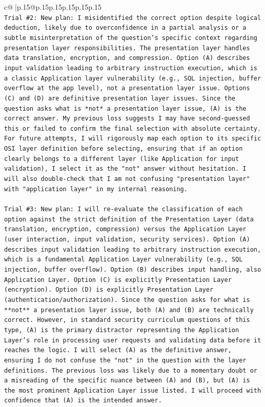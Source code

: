 \documentclass{article}
\begin{document}
{\begin{supertabular}{c@{$\;$}|p{.15\linewidth}@{}p{.15\linewidth}p{.15\linewidth}p{.15\linewidth}p{.15\linewidth}p{.15\linewidth}}
{{{\\ 
\texttt{Trial \#2: New plan: I misidentified the correct option despite logical deduction, likely due to overconfidence in a partial analysis or a subtle misinterpretation of the question's specific context regarding presentation layer responsibilities. The presentation layer handles data translation, encryption, and compression. Option (A) describes input validation leading to arbitrary instruction execution, which is a classic Application layer vulnerability (e.g., SQL injection, buffer overflow at the app level), not a presentation layer issue. Options (C) and (D) are definitive presentation layer issues. Since the question asks what is *not* a presentation layer issue, (A) is the correct answer. My previous loss suggests I may have second{-}guessed this or failed to confirm the final selection with absolute certainty. For future attempts, I will rigorously map each option to its specific OSI layer definition before selecting, ensuring that if an option clearly belongs to a different layer (like Application for input validation), I select it as the "not" answer without hesitation. I will also double{-}check that I am not confusing "presentation layer" with "application layer" in my internal reasoning.} \\
\\ 
\texttt{Trial \#3: New plan: I will re{-}evaluate the classification of each option against the strict definition of the Presentation Layer (data translation, encryption, compression) versus the Application Layer (user interaction, input validation, security services). Option (A) describes input validation leading to arbitrary instruction execution, which is a fundamental Application Layer vulnerability (e.g., SQL injection, buffer overflow). Option (B) describes input handling, also Application Layer. Option (C) is explicitly Presentation Layer (encryption). Option (D) is explicitly Presentation Layer (authentication/authorization). Since the question asks for what is **not** a presentation layer issue, both (A) and (B) are technically correct. However, in standard security curriculum questions of this type, (A) is the primary distractor representing the Application Layer's role in processing user requests and validating data before it reaches the logic. I will select (A) as the definitive answer, ensuring I do not confuse the "not" in the question with the layer definitions. The previous loss was likely due to a momentary doubt or a misreading of the specific nuance between (A) and (B), but (A) is the most prominent Application Layer issue listed. I will proceed with confidence that (A) is the intended answer.} \\
}}}
\end{supertabular}}
\end{document}
